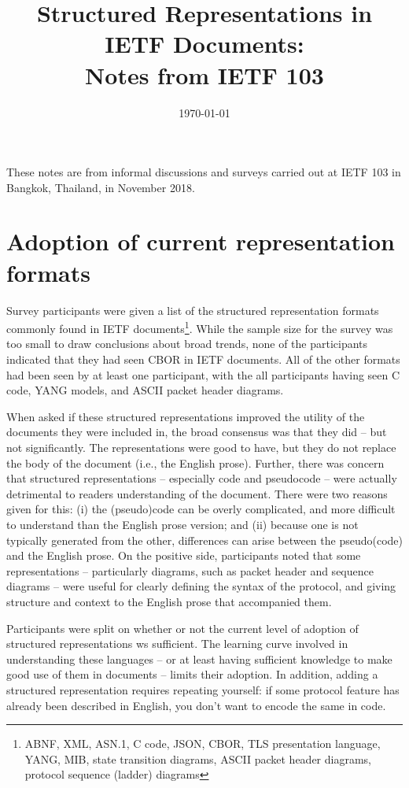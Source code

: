 \documentclass[10pt]{article}
\title{Structured Representations in IETF Documents:\\Notes from IETF 103}
\date{\today}
\begin{document}
\maketitle

These notes are from informal discussions and surveys carried out at IETF 103 in Bangkok,
Thailand, in November 2018. 

\section{Adoption of current representation formats}

Survey participants were given a list of the structured representation formats commonly
found in IETF documents\footnote{ABNF, XML, ASN.1, C code, JSON, CBOR, TLS presentation
language, YANG, MIB, state transition diagrams, ASCII packet header diagrams, protocol
sequence (ladder) diagrams}. While the sample size for the survey was too small to draw
conclusions about broad trends, none of the participants indicated that they had seen
CBOR in IETF documents. All of the other formats had been seen by at least one participant,
with the all participants having seen C code, YANG models, and ASCII packet header diagrams.

When asked if these structured representations improved the utility of the documents they
were included in, the broad consensus was that they did -- but not significantly. The
representations were good to have, but they do not replace the body of the document
(i.e., the English prose). Further, there was concern that structured representations
-- especially code and pseudocode -- were actually detrimental to readers understanding of
the document. There were two reasons given for this: (i) the (pseudo)code can be overly
complicated, and more difficult to understand than the English prose version; and (ii)
because one is not typically generated from the other, differences can arise between the
pseudo(code) and the English prose. On the positive side, participants noted that some
representations -- particularly diagrams, such as packet header and sequence diagrams --
were useful for clearly defining the syntax of the protocol, and giving structure and
context to the English prose that accompanied them.

Participants were split on whether or not the current level of adoption of structured
representations ws sufficient. The learning curve involved in understanding these
languages -- or at least having sufficient knowledge to make good use of them in
documents -- limits their adoption. In addition, adding a structured representation
requires repeating yourself: if some protocol feature has already been described in
English, you don't want to encode the same in code.
\end{document}
